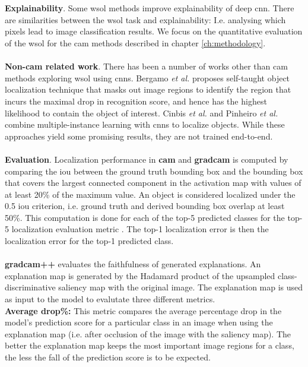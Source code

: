 \\\\
\textbf{Explainability}. Some \acrshort{wsol} methods \cite{chattopadhay2018grad, wang2020score} improve explainability of deep \acrshort{cnn}. There are similarities between the \acrshort{wsol} task and explainability: I.e. analysing which pixels lead to image classification results. We focus on the quantitative evaluation of the \acrshort{wsol} for the \acrshort{cam} methods described in chapter \ref{ch:methodology}.
\\\\
\textbf{Non-\acrshort{cam} related work}. There has been a number of works other than \acrshort{cam} methods exploring \acrfull{wsol} using \acrshort{cnn}s. Bergamo \textit{et al.} \cite{bazzani2016self} proposes self-taught object localization technique that masks out image regions to identify the region that incurs the maximal drop in recognition score, and hence has the highest likelihood to contain the object of interest. Cinbis \textit{et al.} \cite{cinbis2016weakly} and Pinheiro \textit{et al.} \cite{pinheiro2015image} combine multiple-instance learning with \acrshort{cnn}s to localize objects. While these approaches yield some promising results, they are not trained end-to-end.
\\\\
\textbf{Evaluation}. Localization performance in \textbf{\acrshort{cam}} \cite{zhou2016cvpr} and \textbf{\acrshort{gradcam}} \cite{selvaraju2017grad} is computed by comparing the \acrfull{iou} between the ground truth bounding box and the bounding box that covers the largest connected component in the activation map with values of at least 20\% of the maximum value. An object is considered localized under the 0.5 \acrshort{iou} criterion, i.e. ground truth and derived bounding box overlap at least 50\%. This computation is done for each of the top-5 predicted classes for the top-5 localization evaluation metric \cite{russakovsky2015imagenet}. The top-1 localization error is then the localization error for the top-1 predicted class.\\
\\
\textbf{\acrshort{gradcam}++} evaluates the faithfulness of generated explanations. An explanation map is generated by the Hadamard product \cite{million2007hadamard} of the upsampled class-discriminative saliency map with the original image. The explanation map is used as input to the model to evalutate three different metrics.\\
\textbf{Average drop\%:} This metric compares the average percentage drop in the model's prediction score for a particular class in an image when using the explanation map (i.e. after occlusion of the image with the saliency map). The better the explanation map keeps the most important image regions for a class, the less the fall of the prediction score is to be expected.\\

